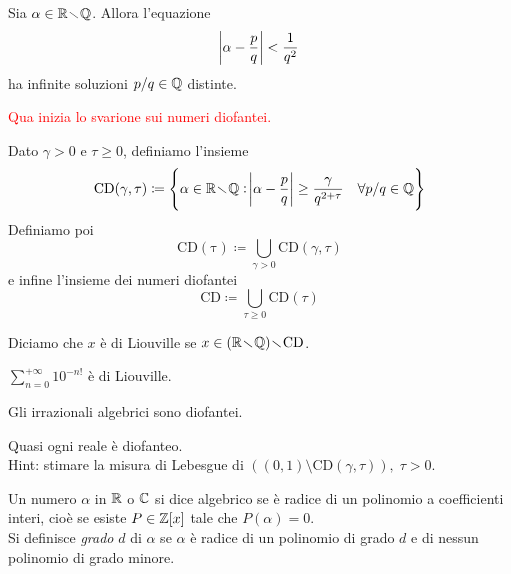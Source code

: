 \begin{exercise}
    Sia $ \alpha \in \mathbb{R}\!\smallsetminus\!\mathbb{Q} $. Allora l'equazione
    \[ \abs{\alpha - \frac{p}{q}} < \frac{1}{q^2} \]
    ha infinite soluzioni $ p/q \in\mathbb{Q} $ distinte.
\end{exercise}

\textcolor{red}{Qua inizia lo svarione sui numeri diofantei.}

\begin{definition}
    Dato $ \gamma > 0 $ e $ \tau \geq 0 $, definiamo l'insieme
    \[ \mathrm{CD(\gamma,\tau)} \coloneqq \left\{ \alpha\in\mathbb{R}\!\smallsetminus\!\mathbb{Q} : \abs{\alpha - \frac{p}{q}} \geq \frac{\gamma}{q^{2+\tau}}\quad \forall p/q\in\mathbb{Q} \right\} \]
    Definiamo poi
    \[ \mathrm{CD(\tau)} \coloneqq \bigcup_{\gamma > 0} \mathrm{CD}(\gamma,\tau) \]
    e infine l'insieme dei numeri diofantei
    \[ \mathrm{CD} \coloneqq \bigcup_{\tau \geq 0} \mathrm{CD}(\tau) \]
\end{definition}

\begin{definition}
    Diciamo che $ x $ è di Liouville se $ x\in (\mathbb{R}\!\smallsetminus\!\mathbb{Q}) \!\smallsetminus\! \mathrm{CD} $.
\end{definition}

\begin{exercise}
    $ \sum_{n=0}^{+\infty} 10^{-n!} $ è di Liouville.
\end{exercise}
\begin{exercise}
    Gli irrazionali algebrici sono diofantei.
\end{exercise}
\begin{exercise}
    Quasi ogni reale è diofanteo.\\
    Hint: stimare la misura di Lebesgue di $ ( (0,1) \setminus \mathrm{CD}(\gamma,\tau) ),\; \tau > 0 $.
\end{exercise}

%
%

\begin{definition}
    Un numero $ \alpha $ in $ \mathbb{R} $ o $ \mathbb{C} $ si dice algebrico se è radice di un polinomio a coefficienti interi, cioè se esiste $ P \in \mathbb{Z}[x] $ tale che $ P(\alpha) = 0 $. \\
    Si definisce \emph{grado} $ d $ di $ \alpha $ se $ \alpha $ è radice di un polinomio di grado $ d $ e di nessun polinomio di grado minore.
\end{definition}

